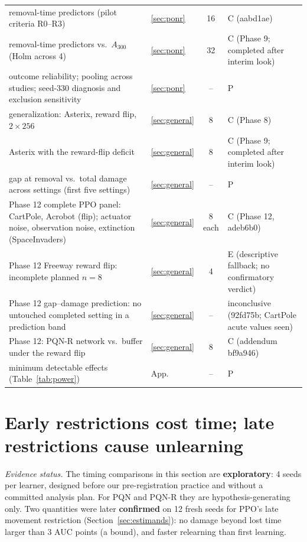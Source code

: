 \documentclass[10pt]{article} %
\begin{document}
\begin{table}[t]
{\begin{tabular}{llcl}
removal-time predictors (pilot criteria R0--R3) & \ref{sec:ponr} & 16 & C (aabd1ae) \\
removal-time predictors vs.\ $A_{300}$ (Holm across 4) & \ref{sec:ponr} & 32 & C (Phase 9; completed after interim look) \\
outcome reliability; pooling across studies; seed-330 diagnosis and exclusion sensitivity & \ref{sec:ponr} & -- & P \\
generalization: Asterix, reward flip, $2\times256$ & \ref{sec:general} & 8 & C (Phase 8) \\
Asterix with the reward-flip deficit & \ref{sec:general} & 8 & C (Phase 9; completed after interim look) \\
gap at removal vs.\ total damage across settings (first five settings) & \ref{sec:general} & -- & P \\
Phase 12 complete PPO panel: CartPole, Acrobot (flip); actuator noise, observation noise, extinction (SpaceInvaders) & \ref{sec:general} & 8 each & C (Phase 12, adeb6b0) \\
Phase 12 Freeway reward flip: incomplete planned $n=8$ & \ref{sec:general} & 4 & E (descriptive fallback; no confirmatory verdict) \\
Phase 12 gap--damage prediction: no untouched completed setting in a prediction band & \ref{sec:general} & -- & inconclusive (92fd75b; CartPole acute values seen) \\
Phase 12: PQN-R network vs.\ buffer under the reward flip & \ref{sec:general} & 8 & C (addendum bf9a946) \\
minimum detectable effects (Table~\ref{tab:power}) & App. & -- & P \\
\bottomrule
\end{tabular}}
\end{table}

\section{Early restrictions cost time; late restrictions cause unlearning}\label{sec:timing}

\noindent\textit{Evidence status.} The timing comparisons in this section are \textbf{exploratory}: 4 seeds per learner, designed before our pre-registration practice and without a committed analysis plan. For PQN and PQN-R they are hypothesis-generating only. Two quantities were later \textbf{confirmed} on 12 fresh seeds for PPO's late movement restriction (Section~\ref{sec:estimands}): no damage beyond lost time larger than 3 AUC points (a bound), and faster relearning than first learning.
\end{document}
